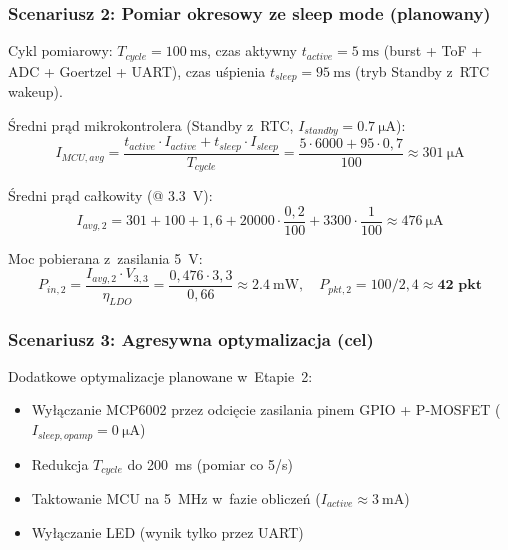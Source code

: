 \documentclass[a4paper,11pt]{article}
\begin{document}
\subsubsection{Scenariusz 2: Pomiar okresowy ze sleep mode (planowany)}

Cykl pomiarowy: $T_{cycle} = \SI{100}{\milli\second}$, czas aktywny
$t_{active} = \SI{5}{\milli\second}$ (burst + ToF + ADC + Goertzel + UART),
czas uśpienia $t_{sleep} = \SI{95}{\milli\second}$ (tryb Standby z~RTC wakeup).

Średni prąd mikrokontrolera (Standby z~RTC, $I_{standby} = \SI{0,7}{\micro\ampere}$):
\begin{equation}
    I_{MCU,avg} = \frac{t_{active} \cdot I_{active} + t_{sleep} \cdot I_{sleep}}{T_{cycle}}
    = \frac{5 \cdot 6000 + 95 \cdot 0{,}7}{100} \approx \SI{301}{\micro\ampere}
    \label{eq:imcu_avg}
\end{equation}

Średni prąd całkowity (@ \SI{3,3}{\volt}):
\begin{equation}
    I_{avg,2} = 301 + 100 + 1{,}6 + 20000 \cdot \frac{0{,}2}{100} + 3300 \cdot \frac{1}{100}
    \approx \SI{476}{\micro\ampere}
\end{equation}

Moc pobierana z~zasilania \SI{5}{\volt}:
\begin{equation}
    P_{in,2} = \frac{I_{avg,2} \cdot V_{3,3}}{\eta_{LDO}} = \frac{0{,}476 \cdot 3{,}3}{0{,}66}
    \approx \SI{2,4}{\milli\watt}, \quad
    P_{pkt,2} = 100/2{,}4 \approx \textbf{42~pkt}
    \label{eq:moc_scen2}
\end{equation}

\subsubsection{Scenariusz 3: Agresywna optymalizacja (cel)}

Dodatkowe optymalizacje planowane w~Etapie~2:
\begin{itemize}[nosep]
    \item Wyłączanie MCP6002 przez odcięcie zasilania pinem GPIO + P-MOSFET
          ($I_{sleep,opamp} = \SI{0}{\micro\ampere}$)
    \item Redukcja $T_{cycle}$ do \SI{200}{\milli\second} (pomiar co 5/s)
    \item Taktowanie MCU na \SI{5}{\mega\hertz} w~fazie obliczeń
          ($I_{active} \approx \SI{3}{\milli\ampere}$)
    \item Wyłączanie LED (wynik tylko przez UART)
\end{itemize}
\end{document}
